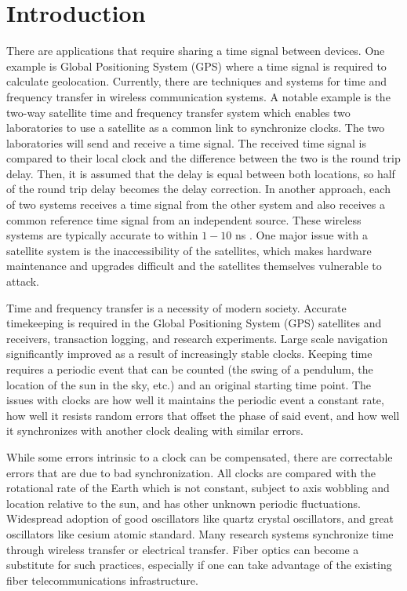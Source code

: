 \chapter{Introduction}

There are applications that require sharing a time signal between devices.  One example is Global Positioning System (GPS) where a time signal is required to calculate geolocation.  Currently, there are techniques and systems for time and frequency transfer in wireless communication systems.  A notable example is the two-way satellite time and frequency transfer system which enables two laboratories to use a satellite as a common link to synchronize clocks.  The two laboratories will send and receive a time signal.  The received time signal is compared to their local clock and the difference between the two is the round trip delay.  Then, it is assumed that the delay is equal between both locations, so half of the round trip delay becomes the delay correction.  In another approach, each of two systems receives a time signal from the other system and also receives a common reference time signal from an independent source.  These wireless systems are typically accurate to within $1-10$ ns \cite{Allan1980}.  One major issue with a satellite system is the inaccessibility of the satellites, which makes hardware maintenance and upgrades difficult and the satellites themselves vulnerable to attack.

Time and frequency transfer is a necessity of modern society. Accurate timekeeping is required in the Global Positioning System (GPS) satellites and receivers, transaction logging, and research experiments. Large scale navigation significantly improved as a result of increasingly stable clocks. Keeping time requires a periodic event that can be counted (the swing of a pendulum, the location of the sun in the sky, etc.) and an original starting time point.  The issues with clocks are how well it maintains the periodic event a constant rate, how well it resists random errors that offset the phase of said event, and how well it synchronizes with another clock dealing with similar errors.

While some errors intrinsic to a clock can be compensated, there are correctable errors that are due to bad synchronization.
All clocks are compared with the rotational rate of the Earth which is not constant, subject to axis wobbling and location relative to the sun, and has other unknown periodic fluctuations. 
Widespread adoption of good oscillators like quartz crystal oscillators, and great oscillators like cesium atomic standard.  Many research systems synchronize time through wireless transfer or electrical transfer.  Fiber optics can become a substitute for such practices, especially if one can take advantage of the existing fiber telecommunications infrastructure.
 

